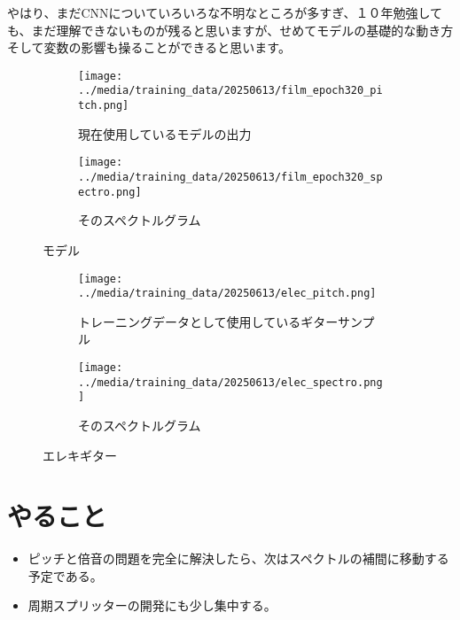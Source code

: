 \documentclass[a4paper, 12pt]{article}
\begin{document}
やはり、まだCNNについていろいろな不明なところが多すぎ、１０年勉強しても、まだ理解できないものが残ると思いますが、せめてモデルの基礎的な動き方そして変数の影響も操ることができると思います。

\begin{figure}
\centering
\begin{subfigure}{1.0\textwidth}
  \centering
  \texttt{[image: ../media/training\_data/20250613/film\_epoch320\_pitch.png]}
  \caption{現在使用しているモデルの出力}
  \label{fig:0606modelWave}
\end{subfigure}
\vspace{5mm}
\begin{subfigure}{1.0\textwidth}
  \centering
  \texttt{[image: ../media/training\_data/20250613/film\_epoch320\_spectro.png]}
  \caption{そのスペクトルグラム}
  \label{fig:0606modelSpectro}
\end{subfigure}
\caption{モデル}
\label{fig:0606Model}
\end{figure}

\begin{figure}
\centering
\begin{subfigure}{1.0\textwidth}
  \centering
  \texttt{[image: ../media/training\_data/20250613/elec\_pitch.png]}
  \caption{トレーニングデータとして使用しているギターサンプル}
  \label{fig:eGuitWave}
\end{subfigure}%
\vspace{5mm}
\begin{subfigure}{1.0\textwidth}
  \centering
  \texttt{[image: ../media/training\_data/20250613/elec\_spectro.png]}
  \caption{そのスペクトルグラム}
  \label{fig:eGuitSpectro}
\end{subfigure}
\caption{エレキギター}
\label{fig:elecGuit}
\end{figure}


\section*{やること}
\begin{itemize}
    \item ピッチと倍音の問題を完全に解決したら、次はスペクトルの補間に移動する予定である。
    \item 周期スプリッターの開発にも少し集中する。
\end{itemize}



\end{document}
